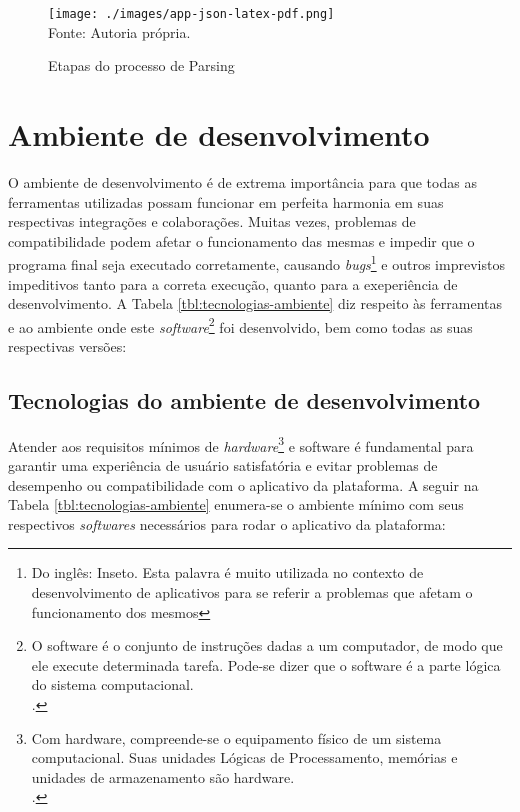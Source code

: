 \begin{figure}[H]
    \centering
    \caption{Etapas do processo de Parsing}
    \texttt{[image: ./images/app-json-latex-pdf.png]}
    \label{fig:app-json-latex-pdf} \\
    \textnormal{\fontsize{10pt}{12pt}Fonte: Autoria própria.}
\end{figure}

\section{Ambiente de desenvolvimento}

O ambiente de desenvolvimento é de extrema importância para que todas as ferramentas
utilizadas possam funcionar em perfeita harmonia em suas respectivas integrações e
colaborações. Muitas vezes, problemas de compatibilidade podem afetar
o funcionamento das mesmas e impedir que o programa final
seja executado corretamente, causando
\textit{bugs}\footnote{Do inglês: Inseto. Esta palavra é muito utilizada no contexto de desenvolvimento de aplicativos
para se referir a problemas que afetam o funcionamento dos mesmos
}
e outros imprevistos impeditivos tanto para a correta execução, quanto
para a exeperiência de desenvolvimento.
A
Tabela \ref{tbl:tecnologias-ambiente}                
diz respeito às ferramentas e ao ambiente onde este
\textit{software}\footnote{O software é o conjunto de instruções dadas a um computador, de modo que
    ele execute determinada tarefa. Pode-se dizer que o software é
    a parte lógica do sistema computacional.  \\  \cite{hardware-e-software}.
}
foi desenvolvido, bem como todas as suas respectivas versões:

\clearpage

\subsection{Tecnologias do ambiente de desenvolvimento}

Atender aos requisitos mínimos de
\textit{hardware}\footnote{Com hardware, compreende-se o equipamento físico de um sistema computacional.
    Suas unidades Lógicas de Processamento, memórias e unidades de armazenamento são
    hardware.  \\  \cite{hardware-e-software}.
}
e software é fundamental para garantir uma experiência de usuário satisfatória
e evitar problemas de desempenho ou compatibilidade com o aplicativo da plataforma.
A seguir
na
Tabela \ref{tbl:tecnologias-ambiente}
enumera-se o ambiente mínimo com seus respectivos
\textit{softwares}
necessários
para rodar o aplicativo da plataforma:

